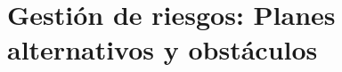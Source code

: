 \chapter{Gestión de riesgos: Planes alternativos y obstáculos}
\label{cap:riesgos}

\begin{table}[H]
    \centering
    \caption{Identificación de riesgos y planes alternativos.}
    \label{tab:riegos}
\end{table}